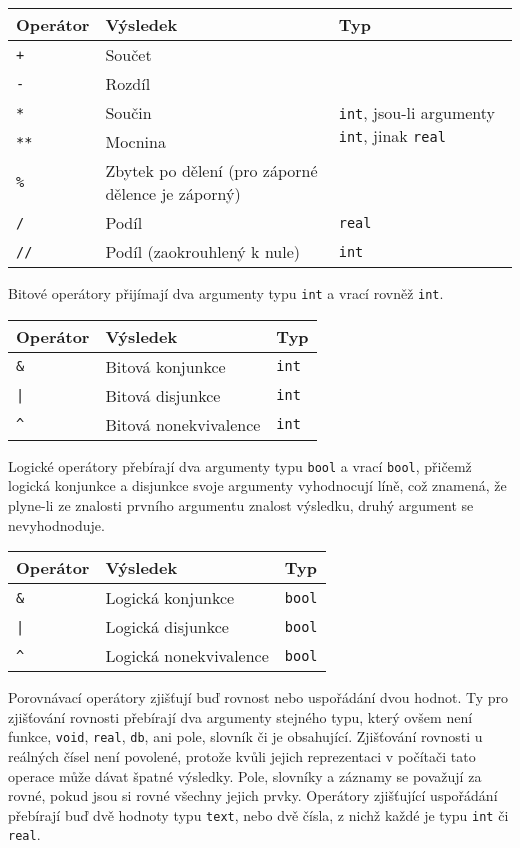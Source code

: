 \documentclass[a4paper,12pt]{article}
\begin{document}
\begin{tabular}{|m{1.5cm} m{5cm} m{8cm}|}\hline
Operátor & Výsledek & Typ\\\hline
\texttt{+} & Součet & \multirow{5}{*}{\texttt{int}, jsou-li argumenty \texttt{int}, jinak \texttt{real}}\\
\texttt{-} & Rozdíl & \\
\texttt{*} & Součin & \\
\texttt{**} & Mocnina & \\
\texttt{\%} & Zbytek po dělení (pro záporné dělence je záporný) & \\\hline
\texttt{/} & Podíl & \texttt{real}\\\hline
\texttt{//} & Podíl (zaokrouhlený k nule) & \texttt{int}\\\hline
\end{tabular}

Bitové operátory přijímají dva argumenty typu \texttt{int} a vrací rovněž \texttt{int}.

\begin{tabular}{|m{1.5cm} m{5cm} m{8cm}|}\hline
Operátor & Výsledek & Typ\\\hline
\texttt{\&} & Bitová konjunkce & \texttt{int}\\\hline
\texttt{|} & Bitová disjunkce & \texttt{int}\\\hline
\texttt{\^} & Bitová nonekvivalence & \texttt{int}\\\hline
\end{tabular}

Logické operátory přebírají dva argumenty typu \texttt{bool} a vrací \texttt{bool}, přičemž logická konjunkce a disjunkce svoje argumenty vyhodnocují líně, což znamená, že plyne-li ze znalosti prvního argumentu znalost výsledku, druhý argument se nevyhodnoduje.

\begin{tabular}{|m{1.5cm} m{5cm} m{8cm}|}\hline
Operátor & Výsledek & Typ\\\hline
\texttt{\&} & Logická konjunkce & \texttt{bool}\\\hline
\texttt{|} & Logická disjunkce & \texttt{bool}\\\hline
\texttt{\^} & Logická nonekvivalence & \texttt{bool}\\\hline
\end{tabular}

Porovnávací operátory zjišťují buď rovnost nebo uspořádání dvou hodnot. Ty pro zjišťování rovnosti přebírají dva argumenty stejného typu, který ovšem není funkce, \texttt{void}, \texttt{real}, \texttt{db}, ani pole, slovník či je obsahující. Zjišťování rovnosti u reálných čísel není povolené, protože kvůli jejich reprezentaci v počítači tato operace může dávat špatné výsledky. Pole, slovníky a záznamy se považují za rovné, pokud jsou si rovné všechny jejich prvky. Operátory zjišťující uspořádání přebírají buď dvě hodnoty typu \texttt{text}, nebo dvě čísla, z nichž každé je typu \texttt{int} či \texttt{real}.
\end{document}
